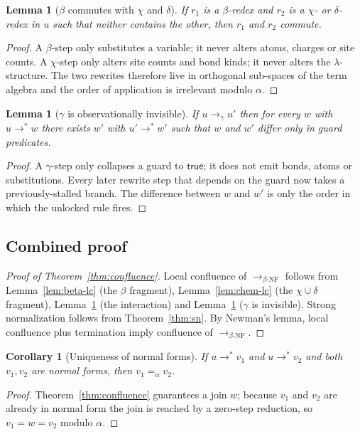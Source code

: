 \documentclass{article}
\newtheorem{lemma}[theorem]{Lemma}
\newtheorem{corollary}[theorem]{Corollary}
\theoremstyle{definition}
\newcommand{\bnf}{\beta\text{-NF}}
\newcommand{\stepsto}{\longrightarrow}
\newcommand{\stepstoAll}{\longrightarrow_{\bnf}}
\begin{document}
\begin{lemma}[$\beta$ commutes with $\chi$ and $\delta$]
\label{lem:beta-chi-commute}
If $r_1$ is a $\beta$-redex and $r_2$ is a $\chi$- or $\delta$-redex in
$u$ such that neither contains the other, then $r_1$ and $r_2$ commute.
\end{lemma}
\begin{proof}
A $\beta$-step only substitutes a variable; it never alters atoms,
charges or site counts. A $\chi$-step only alters site counts and bond
kinds; it never alters the $\lambda$-structure. The two rewrites therefore
live in orthogonal sub-spaces of the term algebra and the order of
application is irrelevant modulo $\alpha$.
\end{proof}

\begin{lemma}[$\gamma$ is observationally invisible]
\label{lem:gamma-invisible}
If $u \stepsto_\gamma u'$ then for every $w$ with $u \stepsto^* w$ there
exists $w'$ with $u' \stepsto^* w'$ such that $w$ and $w'$ differ only in
guard predicates.
\end{lemma}
\begin{proof}
A $\gamma$-step only collapses a guard to $\mathsf{true}$; it does not
emit bonds, atoms or substitutions. Every later rewrite step that depends
on the guard now takes a previously-stalled branch. The difference between
$w$ and $w'$ is only the order in which the unlocked rule fires.
\end{proof}

\subsection{Combined proof}

\begin{proof}[Proof of Theorem~\ref{thm:confluence}]
Local confluence of $\stepstoAll$ follows from
Lemma~\ref{lem:beta-lc} (the $\beta$ fragment),
Lemma~\ref{lem:chem-lc} (the $\chi \cup \delta$ fragment),
Lemma~\ref{lem:beta-chi-commute} (the interaction) and
Lemma~\ref{lem:gamma-invisible} ($\gamma$ is invisible).
Strong normalization follows from Theorem~\ref{thm:sn}. By Newman's
lemma, local confluence plus termination imply confluence of
$\stepstoAll$.
\end{proof}

\begin{corollary}[Uniqueness of normal forms]
If $u \stepsto^* v_1$ and $u \stepsto^* v_2$ and both $v_1, v_2$ are
normal forms, then $v_1 =_{\alpha} v_2$.
\end{corollary}
\begin{proof}
Theorem~\ref{thm:confluence} guarantees a join $w$; because $v_1$ and
$v_2$ are already in normal form the join is reached by a zero-step
reduction, so $v_1 = w = v_2$ modulo $\alpha$.
\end{proof}
\end{document}
